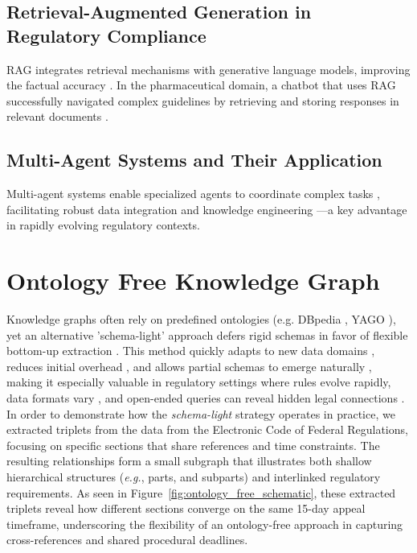\documentclass{article}
\begin{document}
\subsection{Retrieval-Augmented Generation in Regulatory Compliance} RAG \cite{Lewis2021} integrates retrieval mechanisms with generative language models, improving the factual accuracy \cite{Hillebrand24}. In the pharmaceutical domain, a chatbot that uses RAG successfully navigated complex guidelines by retrieving and storing responses in relevant documents \cite{Kim24}.

\subsection{Multi-Agent Systems and Their Application} Multi-agent systems enable specialized agents to coordinate complex tasks \cite{Shoham08,Wooldridge09}, facilitating robust data integration and knowledge engineering \cite{Zygmunt13}—a key advantage in rapidly evolving regulatory contexts.

\section{Ontology Free Knowledge Graph}
Knowledge graphs often rely on predefined ontologies (e.g. DBpedia \cite{Lehmann15}, YAGO \cite{suchanek2007yago}), yet an alternative 'schema-light' approach defers rigid schemas in favor of flexible bottom-up extraction \cite{etzioni2011open, fader2014open}. This method quickly adapts to new data domains \cite{carlson2010architectureNELL}, reduces initial overhead \cite{etzioni2011open}, and allows partial schemas to emerge naturally \cite{hogan2021knowledgegraphs}, making it especially valuable in regulatory settings where rules evolve rapidly, data formats vary \cite{probst2006scalable}, and open-ended queries can reveal hidden legal connections \cite{fader2014open}.
In order to demonstrate how the \emph{schema-light} strategy operates in practice, we extracted triplets from the data from the Electronic Code of Federal Regulations, focusing on specific sections that share references and time constraints. The resulting relationships form a small subgraph that illustrates both shallow hierarchical structures (\emph{e.g.}, parts, and subparts) and interlinked regulatory requirements. As seen in Figure~\ref{fig:ontology_free_schematic}, these extracted triplets reveal how different sections converge on the same 15-day appeal timeframe, underscoring the flexibility of an ontology-free approach in capturing cross-references and shared procedural deadlines.
\end{document}
